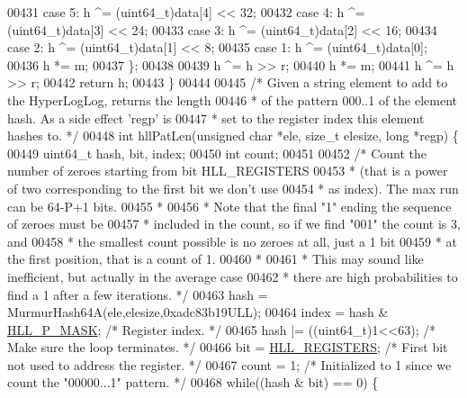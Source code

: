 \begin{DoxyCode}
{{00431     \textcolor{keywordflow}{case} 5: h ^= (uint64\_t)data[4] << 32;
00432     \textcolor{keywordflow}{case} 4: h ^= (uint64\_t)data[3] << 24;
00433     \textcolor{keywordflow}{case} 3: h ^= (uint64\_t)data[2] << 16;
00434     \textcolor{keywordflow}{case} 2: h ^= (uint64\_t)data[1] << 8;
00435     \textcolor{keywordflow}{case} 1: h ^= (uint64\_t)data[0];
00436             h *= m;
00437     \};
00438 
00439     h ^= h >> r;
00440     h *= m;
00441     h ^= h >> r;
00442     \textcolor{keywordflow}{return} h;
00443 \}
00444 
00445 \textcolor{comment}{/* Given a string element to add to the HyperLogLog, returns the length}
00446 \textcolor{comment}{ * of the pattern 000..1 of the element hash. As a side effect 'regp' is}
00447 \textcolor{comment}{ * set to the register index this element hashes to. */}
00448 \textcolor{keywordtype}{int} hllPatLen(\textcolor{keywordtype}{unsigned} \textcolor{keywordtype}{char} *ele, size\_t elesize, \textcolor{keywordtype}{long} *regp) \{
00449     uint64\_t hash, bit, index;
00450     \textcolor{keywordtype}{int} count;
00451 
00452     \textcolor{comment}{/* Count the number of zeroes starting from bit HLL\_REGISTERS}
00453 \textcolor{comment}{     * (that is a power of two corresponding to the first bit we don't use}
00454 \textcolor{comment}{     * as index). The max run can be 64-P+1 bits.}
00455 \textcolor{comment}{     *}
00456 \textcolor{comment}{     * Note that the final "1" ending the sequence of zeroes must be}
00457 \textcolor{comment}{     * included in the count, so if we find "001" the count is 3, and}
00458 \textcolor{comment}{     * the smallest count possible is no zeroes at all, just a 1 bit}
00459 \textcolor{comment}{     * at the first position, that is a count of 1.}
00460 \textcolor{comment}{     *}
00461 \textcolor{comment}{     * This may sound like inefficient, but actually in the average case}
00462 \textcolor{comment}{     * there are high probabilities to find a 1 after a few iterations. */}
00463     hash = MurmurHash64A(ele,elesize,0xadc83b19ULL);
00464     index = hash & \hyperlink{hyperloglog_8c_a044fc7c4835cb04bc9e115baa49805f7}{HLL\_P\_MASK}; \textcolor{comment}{/* Register index. */}
00465     hash |= ((uint64\_t)1<<63); \textcolor{comment}{/* Make sure the loop terminates. */}
00466     bit = \hyperlink{hyperloglog_8c_aa053beb90136828dcb46545c7445fc36}{HLL\_REGISTERS}; \textcolor{comment}{/* First bit not used to address the register. */}
00467     count = 1; \textcolor{comment}{/* Initialized to 1 since we count the "00000...1" pattern. */}
00468     \textcolor{keywordflow}{while}((hash & bit) == 0) \{
}}
\end{DoxyCode}
